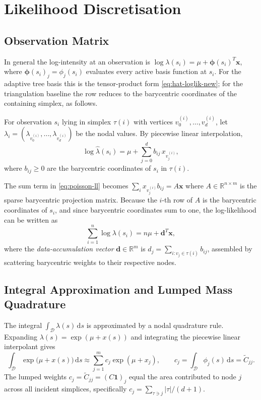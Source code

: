 \documentclass[11pt]{article}
\newcommand{\R}{\mathbb{R}}
\newcommand{\dd}{\,\mathrm{d}}
\newcommand{\bx}{\mathbf{x}}
\newcommand{\bphi}{\boldsymbol{\phi}}
\begin{document}
\section{Likelihood Discretisation}

\subsection{Observation Matrix}

In general the log-intensity at an observation is $\log\lambda(s_i) = \mu +
\bphi(s_i)^T\bx$, where $\bphi(s_i)_j = \phi_j(s_i)$ evaluates every active basis
function at $s_i$.  For the adaptive tree basis this is the tensor-product form
\eqref{eq:hat-loglik-new}; for the triangulation baseline the row reduces to the
barycentric coordinates of the containing simplex, as follows.

For observation $s_i$ lying in simplex $\tau(i)$ with vertices
$v_0^{(i)}, \ldots, v_d^{(i)}$, let $\lambda_i = (\lambda_{v_0^{(i)}}, \ldots,
\lambda_{v_d^{(i)}})$ be the nodal values.  By piecewise linear interpolation,
\begin{equation}
  \log\hat\lambda(s_i) = \mu + \sum_{j=0}^{d} b_{ij} \, x_{v_j^{(i)}},
\end{equation}
where $b_{ij} \ge 0$ are the barycentric coordinates of $s_i$ in $\tau(i)$.

The sum term in \eqref{eq:poisson-ll} becomes $\sum_i x_{v_j^{(i)}} b_{ij} = A\bx$
where $A \in \R^{n \times m}$ is the sparse barycentric projection matrix.
Because the $i$-th row of $A$ is the barycentric coordinates of $s_i$, and
since barycentric coordinates sum to one, the log-likelihood can be written as
\begin{equation}
  \sum_{i=1}^n \log\lambda(s_i) = n\mu + \mathbf{d}^T \bx,
  \label{eq:data-term}
\end{equation}
where the \emph{data-accumulation vector} $\mathbf{d} \in \R^m$ is
$d_j = \sum_{i : v_j \in \tau(i)} b_{ij}$, assembled by scattering barycentric
weights to their respective nodes.

\subsection{Integral Approximation and Lumped Mass Quadrature}
\label{sec:integral-approx}

The integral $\int_\mathcal{D} \lambda(s) \dd s$ is approximated by a
nodal quadrature rule.  Expanding $\lambda(s) = \exp(\mu + x(s))$ and
integrating the piecewise linear interpolant gives
\begin{equation}
  \int_\mathcal{D} \exp\!\bigl(\mu + x(s)\bigr) \dd s
  \approx \sum_{j=1}^m c_j \exp(\mu + x_j),
  \qquad c_j = \int_\mathcal{D} \phi_j(s) \dd s = \tilde{C}_{jj}.
  \label{eq:integral-approx}
\end{equation}
The lumped weights $c_j = \tilde{C}_{jj} = (C\mathbf{1})_j$ equal the area
contributed to node $j$ across all incident simplices, specifically
$c_j = \sum_{\tau \ni j} |\tau|/(d+1)$.
\end{document}
